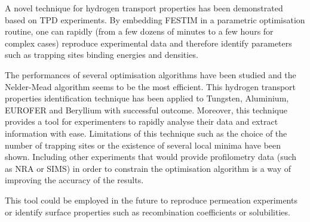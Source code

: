 A novel technique for hydrogen transport properties has been demonstrated based on TPD experiments.
By embedding FESTIM in a parametric optimisation routine, one can rapidly (from a few dozens of minutes to a few hours for complex cases) reproduce experimental data and therefore identify parameters such as trapping sites binding energies and densities.

The performances of several optimisation algorithms have been studied and the Nelder-Mead algorithm seems to be the most efficient.
This hydrogen transport properties identification technique has been applied to Tungsten, Aluminium, EUROFER and Beryllium with successful outcome.
Moreover, this technique provides a tool for experimenters to rapidly analyse their data and extract information with ease.
Limitations of this technique such as the choice of the number of trapping sites or the existence of several local minima have been shown.
Including other experiments that would provide profilometry data (such as NRA or SIMS) in order to constrain the optimisation algorithm is a way of improving the accuracy of the results.

This tool could be employed in the future to reproduce permeation experiments or identify surface properties such as recombination coefficients or solubilities.